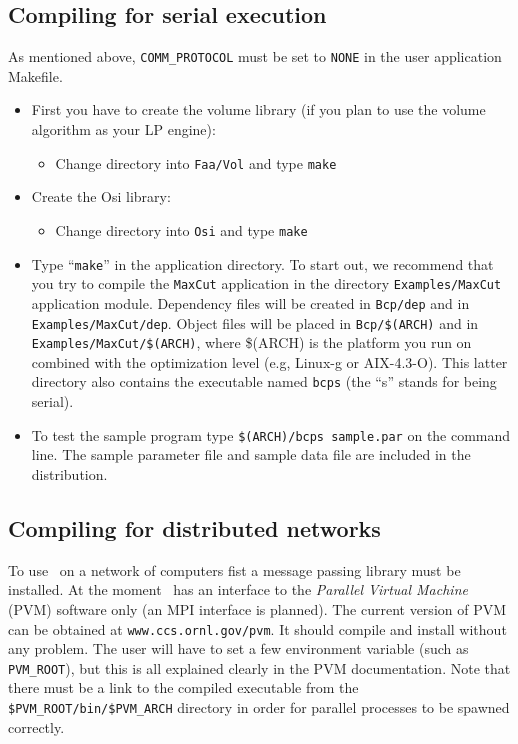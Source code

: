 \subsection{Compiling for serial execution}

As mentioned above, {\tt COMM\_PROTOCOL} must be set to {\tt NONE} in the user
application Makefile. 

\begin{itemize}
\item First you have to create the volume library (if you plan to use the
  volume algorithm as your LP engine):
  \begin{itemize}
  \item Change directory into {\tt Faa/Vol} and type {\tt make}
  \end{itemize}
\item Create the Osi library:
  \begin{itemize}
  \item Change directory into {\tt Osi} and type {\tt make}
  \end{itemize}
\item Type ``{\tt make}'' in the application directory. To
  start out, we recommend that you try to compile the {\tt MaxCut}
  application in the directory {\tt Examples/MaxCut}
  application module. Dependency files will be created in 
  {\tt Bcp/dep} and in 
  {\tt Examples/MaxCut/dep}. Object files will be placed in 
  {\tt Bcp/\$(ARCH)} and in 
  {\tt Examples/MaxCut/\$(ARCH)}, where \$(ARCH) is the platform you
  run on combined with the optimization level (e.g, Linux-g or AIX-4.3-O).
  This latter directory also contains the executable named {\tt bcps} (the
  ``s'' stands for being serial).
\item To test the sample program type {\tt \$(ARCH)/bcps sample.par} on the
  command line. The sample parameter file and sample data file are included 
  in the distribution.
\end{itemize}

\subsection{Compiling for distributed networks}

To use \BB\ on a network of computers fist a message passing library must be
installed. At the moment \BB\ has an interface to the 
{\em Parallel Virtual Machine} (PVM) software only (an MPI interface is
planned). The current version of PVM can be obtained at 
{\tt www.ccs.ornl.gov/pvm}. It should compile and install without 
any problem. The user will have to set a few environment variable (such as 
{\tt PVM\_ROOT}), but this is all explained clearly in the PVM
documentation. Note that there must be a link to the compiled executable
from the {\tt \$PVM\_ROOT/bin/\$PVM\_ARCH} directory in order for
parallel processes to be spawned correctly.

